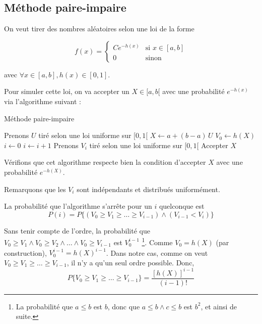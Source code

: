 
\subsection{Méthode paire-impaire}
On veut tirer des nombres aléatoires selon une loi de la forme

\begin{equation}
    f(x) = 
        \begin{cases}
            Ce^{-h(x)} & \text{si } x \in [a, b] \\
            0 & \text{sinon}
        \end{cases}
\end{equation}

avec $\forall x \in [a, b], h(x) \in [0, 1]$.

Pour simuler cette loi, on va accepter un $X \in [a, b[$ avec une probabilité $e^{-h(x)}$ via l'algorithme suivant :

\begin{algorithm}[H]
    \caption{Méthode paire-impaire}
    \begin{algorithmic}[1]
        \Do
            \State Prenons $U$ tiré selon une loi uniforme sur $[0, 1[$
            \State $X \gets a + (b-a)\,U$ \Comment{$X$ est uniforme sur $[a, b[$}
            \State $V_0 \gets h(X)$
            \State $i \gets 0$
            \Do
                \State $i \gets i+1$
                \State Prenons $V_i$ tiré selon une loi uniforme sur $[0, 1[$
        \State Accepter $X$
    \end{algorithmic}
\end{algorithm}

Vérifions que cet algorithme respecte bien la condition d'accepter $X$ avec une probabilité $e^{-h(X)}$.

Remarquons que les $V_i$ sont indépendants et distribués uniformément.

La probabilité que l'algorithme s'arrête pour un $i$ quelconque est
\begin{equation}
    P(i) = P\{(V_0 \geq V_1 \geq \dots \geq V_{i-1}) \wedge (V_{i-1} < V_i)\}
    \label{paireimpaire:eq:probaI}
\end{equation}

Sans tenir compte de l'ordre, la probabilité que $V_0 \geq V_1 \wedge V_0 \geq V_2 \wedge \dots \wedge V_0 \geq V_{i-1}$ est $V_0^{i-1}$ \footnote{La probabilité que $a \leq b$ est $b$, donc que $a \leq b \wedge c \leq b$ est $b^2$, et ainsi de suite.}. Comme $V_0 = h(X)$ (par construction), $V_0^{i-1} = h(X)^{i-1}$. Dans notre cas, comme on veut $V_0 \geq V_1 \geq \dots \geq V_{i-1}$, il n'y a qu'un seul ordre possible. Donc,
$$P\{V_0 \geq V_1 \geq \dots \geq V_{i-1}\} = \frac{[h(X)]^{i-1}}{(i-1)!}$$

